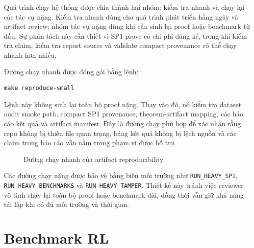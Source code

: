 \documentclass[12pt,a4paper,oneside]{report}
\newcommand{\code}[1]{\texttt{#1}}
\begin{document}
Quá trình chạy hệ thống được chia thành hai nhóm: kiểm tra nhanh và chạy lại các tác vụ nặng. Kiểm tra nhanh dùng cho quá trình phát triển hằng ngày và artifact review; nhóm tác vụ nặng dùng khi cần sinh lại proof hoặc benchmark từ đầu. Sự phân tách này cần thiết vì SP1 prove có chi phí đáng kể, trong khi kiểm tra claim, kiểm tra report source và validate compact provenance có thể chạy nhanh hơn nhiều.

Đường chạy nhanh được đóng gói bằng lệnh:

\begin{verbatim}
make reproduce-small
\end{verbatim}

Lệnh này không sinh lại toàn bộ proof nặng. Thay vào đó, nó kiểm tra dataset audit smoke path, compact SP1 provenance, theorem-artifact mapping, các báo cáo kết quả và artifact manifest. Đây là đường chạy phù hợp để xác nhận rằng repo không bị thiếu file quan trọng, bảng kết quả không bị lệch nguồn và các claim trong báo cáo vẫn nằm trong phạm vi được hỗ trợ.

\begin{figure}[H]
\centering
{}
\caption{Đường chạy nhanh của artifact reproducibility}
\end{figure}

Các đường chạy nặng được bảo vệ bằng biến môi trường như \code{RUN\_HEAVY\_SP1}, \code{RUN\_HEAVY\_BENCHMARKS} và \code{RUN\_HEAVY\_TAMPER}. Thiết kế này tránh việc reviewer vô tình chạy lại toàn bộ proof hoặc benchmark dài, đồng thời vẫn giữ khả năng tái lập khi có đủ môi trường và thời gian.

\section{Benchmark RL}
\end{document}
